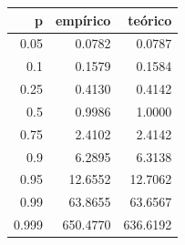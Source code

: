 \begin{tabular}{rrr}
\toprule
p & empírico & teórico \\
\midrule
0.05 & 0.0782 & 0.0787 \\
0.1 & 0.1579 & 0.1584 \\
0.25 & 0.4130 & 0.4142 \\
0.5 & 0.9986 & 1.0000 \\
0.75 & 2.4102 & 2.4142 \\
0.9 & 6.2895 & 6.3138 \\
0.95 & 12.6552 & 12.7062 \\
0.99 & 63.8655 & 63.6567 \\
0.999 & 650.4770 & 636.6192 \\
\bottomrule
\end{tabular}
